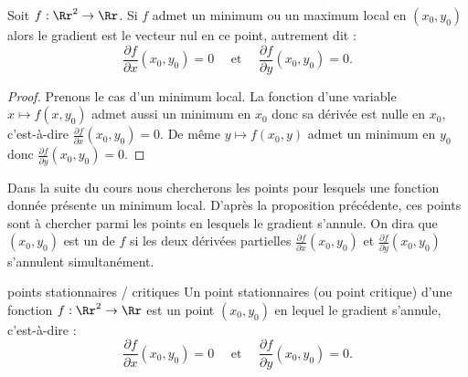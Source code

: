 \begin{proposition}{}{}
	Soit $f : \Rr^2 \to \Rr$. Si $f$ admet un minimum ou un maximum local en $(x_0,y_0)$ alors le gradient est le vecteur nul en ce point, autrement dit :
	$$
	\frac{\partial f}{\partial x}(x_0,y_0) = 0 
	\quad \text{ et  }\quad
	\frac{\partial f}{\partial y}(x_0,y_0) = 0.
	$$
\end{proposition}

\begin{proof}
	Prenons le cas d'un minimum local.
	La fonction d'une variable $x \mapsto f(x, y_0)$ admet aussi un minimum en $x_0$ donc sa dérivée est nulle en $x_0$, c'est-à-dire $\frac{\partial f}{\partial x}(x_0,y_0) = 0$. De même $y \mapsto f(x_0, y)$ admet un minimum en $y_0$ donc $\frac{\partial f}{\partial y}(x_0,y_0) = 0$. 
\end{proof}


Dans la suite du cours nous chercherons les points pour lesquels une fonction donnée présente un minimum local.
D'après la proposition précédente, ces points sont à chercher parmi les points en lesquels le gradient s'annule. On dira que $(x_0,y_0)$ est un  de $f$ si
les deux dérivées partielles $\frac{\partial f}{\partial x}(x_0,y_0)$ et $\frac{\partial f}{\partial y}(x_0,y_0)$ s'annulent simultanément.

\begin{definition}{points stationnaires / critiques}{}
	Un point stationnaires (ou point critique) d'une fonction $f : \Rr^2 \to \Rr$ est un point $(x_0,y_0)$ en lequel le gradient s'annule, c'est-à-dire : 
	$$\frac{\partial f}{\partial x}(x_0,y_0) = 0
	\quad \text{ et } \quad
	\frac{\partial f}{\partial y}(x_0,y_0) = 0.$$
\end{definition}

